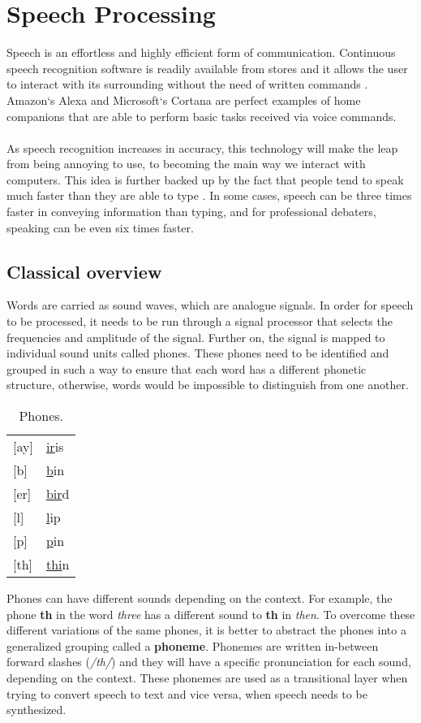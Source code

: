 \chapter{Speech Processing}\label{ch:speech_processing}
Speech is an effortless and highly efficient form of communication.
Continuous speech recognition software is readily available from stores and it allows the user to interact with its surrounding without the need of written commands
\cite[p.~396]{callan2003artificial}. Amazon`s Alexa 
\cite{Alexa} and Microsoft`s Cortana 
\cite{Cortana} are perfect examples of home companions that are able to perform basic tasks received via voice commands.\\\\
As speech recognition increases in accuracy, this technology will make the leap from being annoying to use, to becoming the main way we interact with computers. 
This idea is further backed up by the fact that people tend to speak much faster than they are able to type \cite{Speed}.
In some cases, speech can be three times faster in conveying information than typing, and for professional debaters,
speaking can be even six times faster.

\section{Classical overview}
Words are carried as sound waves, which are analogue signals.
In order for speech to be processed,
it needs to be run through a signal processor that selects the frequencies and amplitude of the signal.
Further on, the signal is mapped to individual sound units called phones.
These phones need to be identified and grouped in such a way to ensure that each word has a different phonetic structure,
otherwise, words would be impossible to distinguish from one another.
\begin{table}[H]
\centering
	\caption{Phones.}
	\label{my-label}
	\begin{tabular}{l l}
		{[}ay{]} & \underline{ir}is \\
		{[}b{]}  & \underline{b}in  \\
		{[}er{]} & \underline{bir}d \\
		{[}l{]}  & \underline{l}ip  \\
		{[}p{]}  & \underline{p}in  \\
		{[}th{]} & \underline{thi}n
	\end{tabular}
\end{table}
Phones can have different sounds depending on the context. 
For example, the phone \textbf{th} in the word \textit{three} has a different sound to \textbf{th} in \textit{then}. 
To overcome these different variations of the same phones, 
it is better to abstract the phones into a generalized grouping called a \textbf{phoneme}.
Phonemes are written in-between forward slashes
(\textit{/th/}) and they will have a specific pronunciation for each sound, depending on the context.
These phonemes are used as a transitional layer when trying to convert speech to text and vice versa,
when speech needs to be synthesized.

